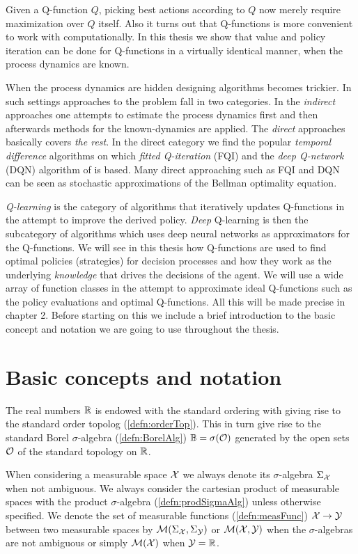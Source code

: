 Given a Q-function $Q$, picking best actions according to $Q$ now
merely require maximization over $Q$ itself.
Also it turns out that Q-functions is
more convenient to work with computationally.
In this thesis we show that value and policy iteration can be done
for Q-functions in a virtually identical manner, when the process dynamics
are known.

When the process dynamics are hidden designing algorithms becomes trickier.
In such settings approaches to the problem
fall in two categories. In the \emph{indirect} approaches
one attempts to estimate the process dynamics first and then afterwards
methods for the known-dynamics are applied.
The \emph{direct} approaches basically covers \emph{the rest}.
In the direct category we find the popular \emph{temporal difference}
algorithms on which \emph{fitted Q-iteration} (FQI)
and the \emph{deep Q-network} (DQN) algorithm of  is based.
Many direct approaching such as FQI and DQN can be seen as
stochastic approximations of the Bellman optimality equation.

\emph{Q-learning} is the category of algorithms that iteratively updates
Q-functions in the attempt to improve the derived policy.
\emph{Deep} Q-learning is then the subcategory of algorithms which
uses deep neural networks as approximators for the Q-functions.
We will see in this thesis how Q-functions are used to find optimal
policies (strategies) for decision processes and how they work
as the underlying \emph{knowledge} that drives the decisions of
the agent. We will use a wide array of function classes in the attempt
to approximate ideal Q-functions such as the policy evaluations and
optimal Q-functions.
All this will be made precise in chapter 2.
Before starting on this we include a brief introduction to the basic
concept and notation we are going to use throughout the thesis.

\section{Basic concepts and notation}

The real numbers $\mathbb{R}$ is endowed with
the standard ordering with
giving rise to the
standard order topolog
(\cref{defn:orderTop}).
This in turn give rise to the standard Borel $\sigma$-algebra
(\cref{defn:BorelAlg}) $\mathbb{B} = \sigma(\mathcal{O})$
generated by the open sets $\mathcal{O}$ of the standard topology on $\mathbb{R}$.

When considering a measurable space $\mathcal{X}$ 
we always denote its $\sigma$-algebra
$\Sigma_\mathcal{X}$ when not ambiguous.
We always
consider the cartesian product of measurable spaces
with the product $\sigma$-algebra (\cref{defn:prodSigmaAlg})
unless otherwise specified.
We denote the set of measurable functions (\cref{defn:measFunc})
$\mathcal{X} \to \mathcal{Y}$ between two measurable spaces by 
$\mathcal{M}(\Sigma_\mathcal{X}, \Sigma_\mathcal{Y})$ or $\mathcal{M}(\mathcal{X}, \mathcal{Y})$
when the $\sigma$-algebras are not ambiguous
or simply $\mathcal{M}(\mathcal{X})$ when $\mathcal{Y} = \mathbb{R}$.


